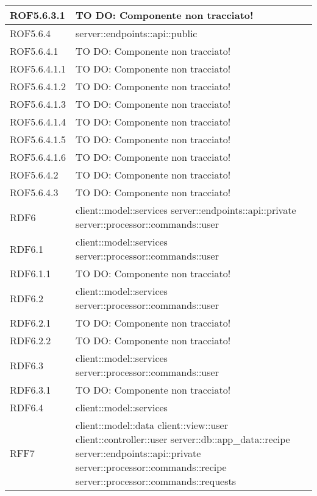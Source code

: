 \begin{center}
\begin{longtable}{| p{4cm} | p{8cm} |}
\hline
ROF5.6.3.1 & TO DO: Componente non tracciato! \\
\hline
ROF5.6.4 & server::endpoints::api::public \\
\hline
ROF5.6.4.1 & TO DO: Componente non tracciato! \\
\hline
ROF5.6.4.1.1 & TO DO: Componente non tracciato! \\
\hline
ROF5.6.4.1.2 & TO DO: Componente non tracciato! \\
\hline
ROF5.6.4.1.3 & TO DO: Componente non tracciato! \\
\hline
ROF5.6.4.1.4 & TO DO: Componente non tracciato! \\
\hline
ROF5.6.4.1.5 & TO DO: Componente non tracciato! \\
\hline
ROF5.6.4.1.6 & TO DO: Componente non tracciato! \\
\hline
ROF5.6.4.2 & TO DO: Componente non tracciato! \\
\hline
ROF5.6.4.3 & TO DO: Componente non tracciato! \\
\hline
RDF6 & client::model::services \newline server::endpoints::api::private \newline server::processor::commands::user \\
\hline
RDF6.1 & client::model::services \newline server::processor::commands::user \\
\hline
RDF6.1.1 & TO DO: Componente non tracciato! \\
\hline
RDF6.2 & client::model::services \newline server::processor::commands::user \\
\hline
RDF6.2.1 & TO DO: Componente non tracciato! \\
\hline
RDF6.2.2 & TO DO: Componente non tracciato! \\
\hline
RDF6.3 & client::model::services \newline server::processor::commands::user \\
\hline
RDF6.3.1 & TO DO: Componente non tracciato! \\
\hline
RDF6.4 & client::model::services \\
\hline
RFF7 & client::model::data \newline client::view::user \newline client::controller::user \newline server::db::app\_data::recipe \newline server::endpoints::api::private \newline server::processor::commands::recipe \newline server::processor::commands::requests \\

\end{longtable}
\end{center}
